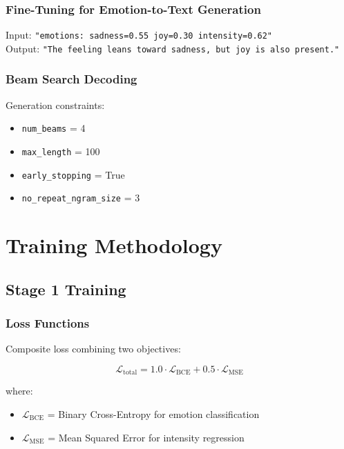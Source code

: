 \documentclass[12pt, a4paper]{report}
\begin{document}
\subsection{Fine-Tuning for Emotion-to-Text Generation}

Input: \texttt{"emotions: sadness=0.55 joy=0.30 intensity=0.62"} \\
Output: \texttt{"The feeling leans toward sadness, but joy is also present."}

\subsection{Beam Search Decoding}

Generation constraints:
\begin{itemize}
    \item \texttt{num\_beams} = 4
    \item \texttt{max\_length} = 100
    \item \texttt{early\_stopping} = True
    \item \texttt{no\_repeat\_ngram\_size} = 3
\end{itemize}

\chapter{Training Methodology}

\section{Stage 1 Training}

\subsection{Loss Functions}

Composite loss combining two objectives:

\begin{equation}
    \mathcal{L}_{\text{total}} = 1.0 \cdot \mathcal{L}_{\text{BCE}} + 0.5 \cdot \mathcal{L}_{\text{MSE}}
\end{equation}

where:
\begin{itemize}
    \item $\mathcal{L}_{\text{BCE}}$ = Binary Cross-Entropy for emotion classification
    \item $\mathcal{L}_{\text{MSE}}$ = Mean Squared Error for intensity regression
\end{itemize}
\end{document}

